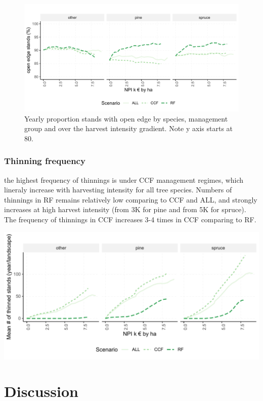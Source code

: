 \documentclass[]{elsarticle} %
\makeatletter
\def\maxwidth{\ifdim\Gin@nat@width>\linewidth\linewidth
\else\Gin@nat@width\fi}
\let\Oldincludegraphics\includegraphics
\renewcommand{\includegraphics}[1]{\Oldincludegraphics[width=\maxwidth]{#1}}
\makeatother
\begin{document}
\begin{figure}
\centering
\includegraphics{test_manus_files/figure-latex/fig_6_count_open_edge-1.pdf}
\caption{Yearly proportion stands with open edge by species, management
group and over the harvest intensity gradient. Note y axis starts at
80.}
\end{figure}

\subsubsection{Thinning frequency}\label{thinning-frequency}

the highest frequency of thinnings is under CCF management regimes,
which lineraly increase with harvesting intensity for all tree species.
Numbers of thinnings in RF remains relatively low comparing to CCF and
ALL, and strongly increases at high harvest intensity (from 3K for pine
and from 5K for spruce). The frequency of thinnings in CCF increases 3-4
times in CCF comparing to RF.

\includegraphics{test_manus_files/figure-latex/unnamed-chunk-2-1.pdf}

\section{Discussion}\label{discussion}
\end{document}
